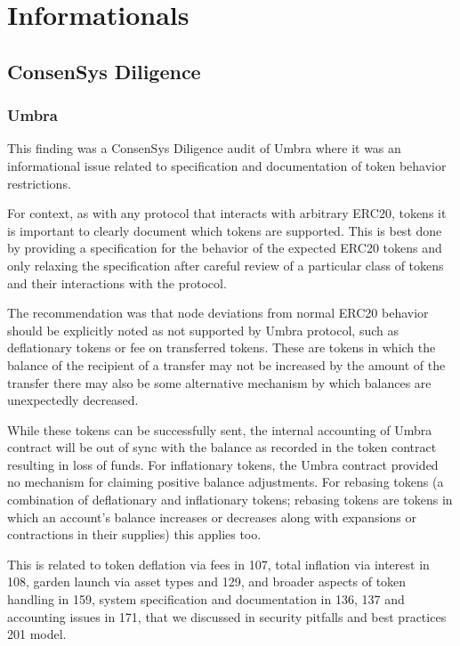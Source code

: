 \section{Informationals}\label{informationals}

\subsection{ConsenSys Diligence}\label{consensys-diligence}

\subsubsection{Umbra}\label{umbra}

This finding was a ConsenSys Diligence audit of Umbra where it was an
informational issue related to specification and documentation of token
behavior restrictions.

For context, as with any protocol that interacts with arbitrary ERC20,
tokens it is important to clearly document which tokens are supported.
This is best done by providing a specification for the behavior of the
expected ERC20 tokens and only relaxing the specification after careful
review of a particular class of tokens and their interactions with the
protocol.

The recommendation was that node deviations from normal ERC20 behavior
should be explicitly noted as not supported by Umbra protocol, such as
deflationary tokens or fee on transferred tokens. These are tokens in
which the balance of the recipient of a transfer may not be increased by
the amount of the transfer there may also be some alternative mechanism
by which balances are unexpectedly decreased.

While these tokens can be successfully sent, the internal accounting of
Umbra contract will be out of sync with the balance as recorded in the
token contract resulting in loss of funds. For inflationary tokens, the
Umbra contract provided no mechanism for claiming positive balance
adjustments. For rebasing tokens (a combination of deflationary and
inflationary tokens; rebasing tokens are tokens in which an account's
balance increases or decreases along with expansions or contractions in
their supplies) this applies too.

This is related to token deflation via fees in 107, total inflation via
interest in 108, garden launch via asset types and 129, and broader
aspects of token handling in 159, system specification and documentation
in 136, 137 and accounting issues in 171, that we discussed in security
pitfalls and best practices 201 model.

